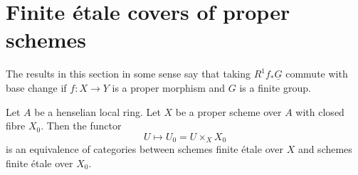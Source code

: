 \section{Finite \'etale covers of proper schemes}
\label{section-finite-etale-over-proper}

\noindent
The results in this section in some sense say that taking
$R^1f_*\underline{G}$ commute with base change if $f : X \to Y$
is a proper morphism and $G$ is a finite group.

\begin{lemma}
\label{lemma-finite-etale-on-proper-over-henselian}
Let $A$ be a henselian local ring. Let $X$ be a proper scheme over $A$
with closed fibre $X_0$. Then the functor
$$
U \longmapsto U_0 = U \times_X X_0
$$
is an equivalence of categories between schemes finite \'etale over
$X$ and schemes finite \'etale over $X_0$.
\end{lemma}

